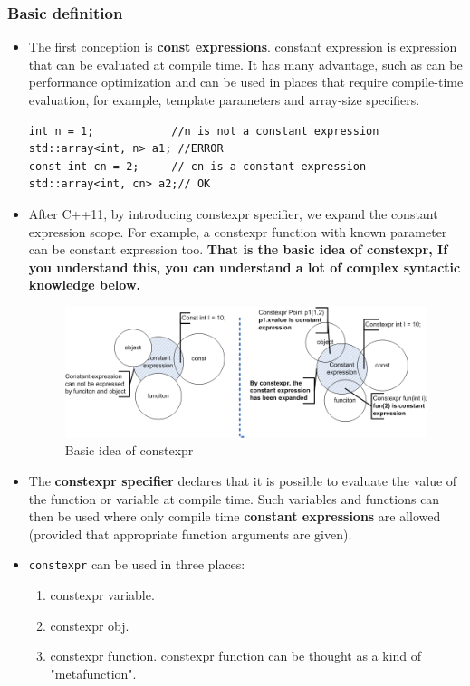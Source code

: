 \documentclass[a4paper,11pt,twoside]{book}
\begin{document}
\subsubsection{Basic definition}
\begin{itemize}

	\item The first conception is \textbf{const expressions}. constant expression is expression that can be evaluated at compile time. It has many advantage, such as can be performance optimization and can be used in places that require compile-time evaluation, for example, template parameters and array-size specifiers.
\begin{lstlisting}
int n = 1;            //n is not a constant expression
std::array<int, n> a1; //ERROR 
const int cn = 2;     // cn is a constant expression
std::array<int, cn> a2;// OK 
\end{lstlisting}

	\item After C++11, by introducing constexpr specifier, we expand the constant expression scope. For example, a constexpr function with known parameter can be constant expression too. \textbf{That is the basic idea of constexpr, If you understand this, you can understand a lot of complex syntactic knowledge below.}
\begin{figure}[h]
	\centering
	\includegraphics[width=0.9\linewidth]{pics/constexpr.png}
	\caption{Basic idea of constexpr}
	\label{fig:constexpr}
\end{figure}
	
	\item The \textbf{constexpr specifier} declares that it is possible to evaluate the value of the function or variable at compile time. Such variables and functions can then be used where only compile time \textbf{constant expressions} are allowed (provided that appropriate function arguments are given). 

	\item \texttt{constexpr} can be used in three places: 
\begin{enumerate}
	\item constexpr variable.
	\item constexpr obj.
	\item constexpr function. constexpr function can be thought as a kind of "metafunction".
\end{enumerate}


\end{itemize}
\end{document}
